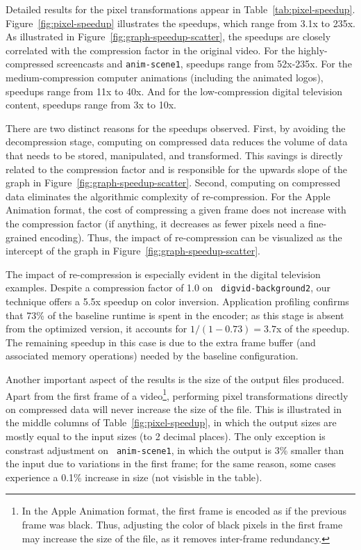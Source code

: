 Detailed results for the pixel transformations appear in
Table~\ref{tab:pixel-speedup}.  Figure~\ref{fig:pixel-speedup}
illustrates the speedups, which range from 3.1x to 235x.  As
illustrated in Figure~\ref{fig:graph-speedup-scatter}, the speedups
are closely correlated with the compression factor in the original
video.  For the highly-compressed screencasts and {\tt anim-scene1},
speedups range from 52x-235x.  For the medium-compression computer
animations (including the animated logos), speedups range from 11x to
40x.  And for the low-compression digital television content, speedups
range from 3x to 10x.

There are two distinct reasons for the speedups observed.  First, by
avoiding the decompression stage, computing on compressed data reduces
the volume of data that needs to be stored, manipulated, and
transformed.  This savings is directly related to the compression
factor and is responsible for the upwards slope of the graph in
Figure~\ref{fig:graph-speedup-scatter}.  Second, computing on
compressed data eliminates the algorithmic complexity of
re-compression.  For the Apple Animation format, the cost of
compressing a given frame does not increase with the compression
factor (if anything, it decreases as fewer pixels need a fine-grained
encoding).  Thus, the impact of re-compression can be visualized as
the intercept of the graph in Figure~\ref{fig:graph-speedup-scatter}.

The impact of re-compression is especially evident in the digital
television examples.  Despite a compression factor of 1.0 on {\tt
digvid-background2}, our technique offers a 5.5x speedup on color
inversion.  Application profiling confirms that 73\% of the baseline
runtime is spent in the encoder; as this stage is absent from the
optimized version, it accounts for $1/(1-0.73) = 3.7$x of the speedup.
The remaining speedup in this case is due to the extra frame buffer
(and associated memory operations) needed by the baseline
configuration.

Another important aspect of the results is the size of the output
files produced.  Apart from the first frame of a video\footnote{In the
Apple Animation format, the first frame is encoded as if the previous
frame was black.  Thus, adjusting the color of black pixels in the
first frame may increase the size of the file, as it removes
inter-frame redundancy.}, performing pixel transformations directly on
compressed data will never increase the size of the file.  This is
illustrated in the middle columns of Table~\ref{fig:pixel-speedup}, in
which the output sizes are mostly equal to the input sizes (to 2
decimal places).  The only exception is constrast adjustment on {\tt
anim-scene1}, in which the output is 3\% smaller than the input due to
variations in the first frame; for the same reason, some cases
experience a 0.1\% increase in size (not visisble in the table).

